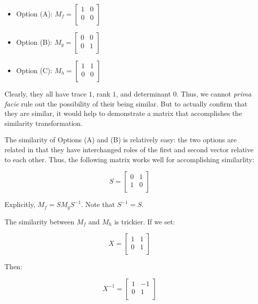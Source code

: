 \documentclass[10pt]{amsart}
\begin{document}
\begin{enumerate}
  \begin{itemize}
  \item Option (A): $M_f = \left[\begin{matrix} 1 & 0 \\ 0 & 0 \\\end{matrix}\right]$
  \item Option (B): $M_g = \left[\begin{matrix} 0 & 0 \\ 0 & 1 \\\end{matrix}\right]$
  \item Option (C): $M_h =  \left[\begin{matrix} 1 & 1 \\ 0 & 0 \\\end{matrix}\right]$
  \end{itemize}

  Clearly, they all have trace $1$, rank $1$, and determinant
  $0$. Thus, we cannot {\em prima facie} rule out the possibility of
  their being similar. But to actually confirm that they are similar,
  it would help to demonstrate a matrix that accomplishes the
  similarity transformation.

  The similarity of Options (A) and (B) is relatively easy: the two
  options are related in that they have interchanged roles of the
  first and second vector relative to each other. Thus, the following
  matrix works well for accomplishing similarlity:

  $$S = \left[\begin{matrix} 0 & 1 \\ 1 & 0 \\\end{matrix}\right]$$

  Explicitly, $M_f = SM_gS^{-1}$. Note that $S^{-1} = S$.

  The similarity between $M_f$ and $M_h$ is trickier. If we set:

  $$X = \left[\begin{matrix} 1 & 1 \\ 0 & 1 \\\end{matrix}\right]$$

  Then:

  $$X^{-1} = \left[\begin{matrix} 1 & -1 \\ 0 & 1 \\\end{matrix}\right]$$


\end{enumerate}
\end{document}
